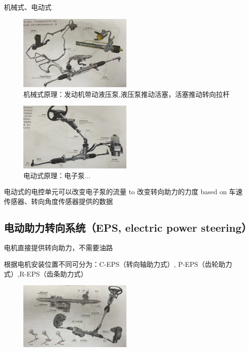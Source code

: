 	机械式、电动式
	
	
	\begin{figure}[htbp]
		\centering
		\caption*{\normalsize 机械式原理：发动机带动液压泵,液压泵推动活塞，活塞推动转向拉杆}
		\includegraphics[width=0.5\textwidth]{3-36}
	\end{figure}

	
	\begin{figure}[htbp]
		\centering
		\caption*{\normalsize 电动式原理：电子泵...}
		\includegraphics[width=0.5\textwidth]{3-37}
	\end{figure}
	
	电动式的电控单元可以改变电子泵的流量 to 改变转向助力的力度 based on 车速传感器、转向角度传感器提供的数据
	
\subsection{电动助力转向系统（EPS, electric power steering）}
	电机直接提供转向助力，不需要油路
	
	根据电机安装位置不同可分为：C-EPS（转向轴助力式）, P-EPS（齿轮助力式）,R-EPS（齿条助力式）
	\begin{figure}[htbp]
		\centering
		\includegraphics[width=0.5\textwidth]{3-38}
	\end{figure}
